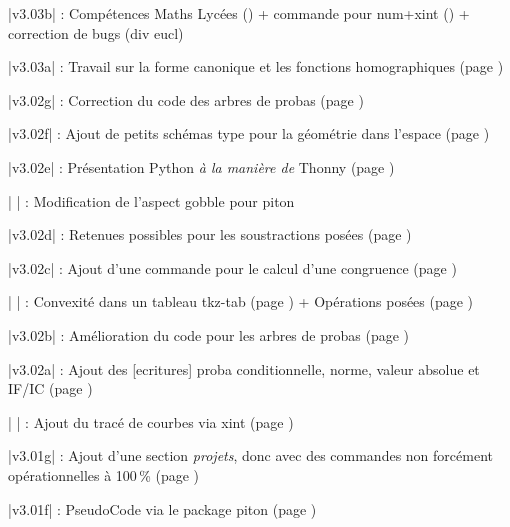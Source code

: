{\small \bverb|v3.03b| : Compétences Maths Lycées (\pageref{competlycee}) + commande pour num+xint (\pageref{pflnum}) + correction de bugs (div eucl)}

{\small \bverb|v3.03a| : Travail sur la forme canonique et les fonctions homographiques (page \pageref{canonhomo})}

{\small \bverb|v3.02g| : Correction du code des arbres de probas (page \pageref{arbresprobas})}

{\small \bverb|v3.02f| : Ajout de petits schémas type pour la géométrie dans l'espace (page \pageref{schemasespace})}

{\small \bverb|v3.02e| : Présentation \textsf{Python} \textit{à la manière de} Thonny (page \pageref{pitonthonny})}

{\small \bverb|      | : Modification de l'aspect \textsf{gobble} pour \textsf{piton}}

{\small \bverb|v3.02d| : Retenues possibles pour les soustractions posées (page \pageref{opeposees})}

{\small \bverb|v3.02c| : Ajout d'une commande pour le calcul d'une congruence (page \pageref{restemodulo})}

{\small \bverb|      | : Convexité dans un tableau \textsf{tkz-tab} (page \pageref{tkzconvex}) + Opérations posées (page \pageref{opeposees})}

{\small \bverb|v3.02b| : Amélioration du code pour les arbres de probas (page \pageref{arbresprobas})}

{\small \bverb|v3.02a| : Ajout des \textsf{[ecritures]} proba conditionnelle, norme, valeur absolue et IF/IC (page \pageref{IFIC})}

{\small \bverb|      | : Ajout du tracé de courbes via \textsf{xint} (page \pageref{courbexint})}

{\small \bverb|v3.01g| : Ajout d'une section \textit{projets}, donc avec des commandes non forcément opérationnelles à 100\,\% (page \pageref{projets})}

{\small \bverb|v3.01f| : PseudoCode via le package \textsf{piton} (page \pageref{pitonpcode})}

